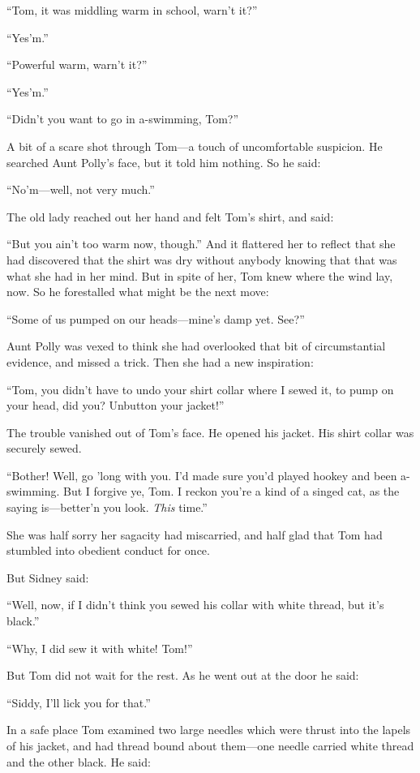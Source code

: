 \documentclass{book}
\begin{document}
“Tom, it was middling warm in school, warn’t it?”

“Yes’m.”

“Powerful warm, warn’t it?”

“Yes’m.”

“Didn’t you want to go in a-swimming, Tom?”

A bit of a scare shot through Tom—a touch of uncomfortable suspicion. He searched Aunt Polly’s face, but it told him nothing. So he said:

“No’m—well, not very much.”

The old lady reached out her hand and felt Tom’s shirt, and said:

“But you ain’t too warm now, though.” And it flattered her to reflect that she had discovered that the shirt was dry without anybody knowing that that was what she had in her mind. But in spite of her, Tom knew where the wind lay, now. So he forestalled what might be the next move:

“Some of us pumped on our heads—mine’s damp yet. See?”

Aunt Polly was vexed to think she had overlooked that bit of circumstantial evidence, and missed a trick. Then she had a new inspiration:

“Tom, you didn’t have to undo your shirt collar where I sewed it, to pump on your head, did you? Unbutton your jacket!”

The trouble vanished out of Tom’s face. He opened his jacket. His shirt collar was securely sewed.

“Bother! Well, go ’long with you. I’d made sure you’d played hookey and been a-swimming. But I forgive ye, Tom. I reckon you’re a kind of a singed cat, as the saying is—better’n you look. \emph{This} time.”

She was half sorry her sagacity had miscarried, and half glad that Tom had stumbled into obedient conduct for once.

But Sidney said:

“Well, now, if I didn’t think you sewed his collar with white thread, but it’s black.”

“Why, I did sew it with white! Tom!”

But Tom did not wait for the rest. As he went out at the door he said:

“Siddy, I’ll lick you for that.”

In a safe place Tom examined two large needles which were thrust into the lapels of his jacket, and had thread bound about them—one needle carried white thread and the other black. He said:
\end{document}
